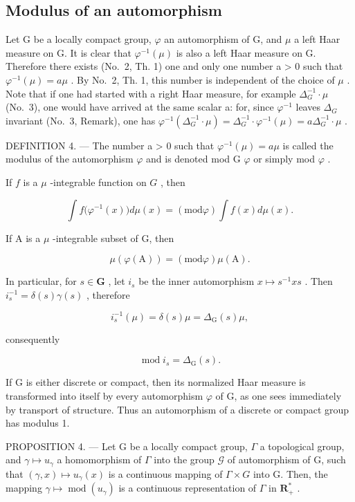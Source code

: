\subsection{Modulus of an automorphism}

Let G be a locally compact group, \(\varphi\) an automorphism of G, and \(\mu\) a left Haar measure on G. It is clear that \(\varphi^{-1}(\mu)\) is also a left Haar measure on G. Therefore there exists (No.~2, Th. 1) one and only one number a \textgreater{} 0 such that \(\varphi^{-1}(\mu) = a\mu\) . By No.~2, Th. 1, this number is independent of the choice of \(\mu\) . Note that if one had started with a right Haar measure, for example \(\Delta_{G}^{-1} \cdot \mu\) (No.~3), one would have arrived at the same scalar a: for, since \(\varphi^{-1}\) leaves \(\Delta_{G}\) invariant (No.~3, Remark), one has \(\varphi^{-1}(\Delta_{G}^{-1} \cdot \mu) = \Delta_{G}^{-1} \cdot \varphi^{-1}(\mu) = a\Delta_{G}^{-1} \cdot \mu\) .

DEFINITION 4. --- The number a \textgreater{} 0 such that \(\varphi^{-1}(\mu) = a\mu\) is called the modulus of the automorphism \(\varphi\) and is denoted mod G \(\varphi\) or simply mod \(\varphi\) .

If \(f\) is a \(\mu\) -integrable function on \(G\) , then

\[
\int f \big (\varphi^ {- 1} (x) \big) d \mu (x) = (\mathrm{mod} \varphi) \int f (x) d \mu (x).\tag{31}
\]

If A is a \(\mu\) -integrable subset of G, then

\[
\mu (\varphi (\mathrm{A})) = (\mathrm{mod} \varphi) \mu (\mathrm{A}).\tag{32}
\]

In particular, for \(s \in \mathbf{G}\) , let \(i_s\) be the inner automorphism \(x \mapsto s^{-1}xs\) . Then \(i_s^{-1} = \delta(s)\gamma(s)\) , therefore

\[
i _ {s} ^ {- 1} (\mu) = \delta (s) \mu = \Delta_ {\mathrm{G}} (s) \mu ,
\]

consequently

\[
\operatorname{mod} i _ {s} = \Delta_ {\mathrm{G}} (s).\tag{33}
\]

If G is either discrete or compact, then its normalized Haar measure is transformed into itself by every automorphism \(\varphi\) of G, as one sees immediately by transport of structure. Thus an automorphism of a discrete or compact group has modulus 1.

PROPOSITION 4. --- Let G be a locally compact group, \(\Gamma\) a topological group, and \(\gamma \mapsto u_{\gamma}\) a homomorphism of \(\Gamma\) into the group \(\mathcal{G}\) of automorphism of G, such that \((\gamma, x) \mapsto u_{\gamma}(x)\) is a continuous mapping of \(\Gamma \times G\) into G. Then, the mapping \(\gamma \mapsto \operatorname{mod}(u_{\gamma})\) is a continuous representation of \(\Gamma\) in \(\mathbf{R}_{+}^{*}\) .

